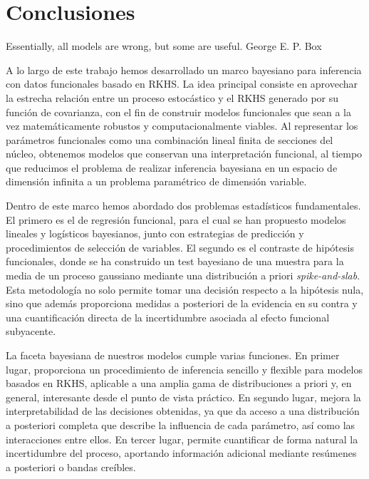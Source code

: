 \setcounter{saveddepth}{\value{tocdepth}}
\addtocounter{chapter}{-1}
\renewcommand{\theHchapter}{\thechapter.repeated} %
\chapter{Conclusiones}\label{ch:conclusiones}

\begin{flushquote}
    {Essentially, all models are wrong, but some are useful.}
    {George E. P. Box}
\end{flushquote}

A lo largo de este trabajo hemos desarrollado un marco bayesiano para inferencia con datos funcionales basado en \acs{RKHS}. La idea principal consiste en aprovechar la estrecha relación entre un proceso estocástico y el \acs{RKHS} generado por su función de covarianza, con el fin de construir modelos funcionales que sean a la vez matemáticamente robustos y computacionalmente viables. Al representar los parámetros funcionales como una combinación lineal finita de secciones del núcleo, obtenemos modelos que conservan una interpretación funcional, al tiempo que reducimos el problema de realizar inferencia bayesiana en un espacio de dimensión infinita a un problema paramétrico de dimensión variable.

Dentro de este marco hemos abordado dos problemas estadísticos fundamentales. El primero es el de regresión funcional, para el cual se han propuesto modelos lineales y logísticos bayesianos, junto con estrategias de predicción y procedimientos de selección de variables. El segundo es el contraste de hipótesis funcionales, donde se ha construido un test bayesiano de una muestra para la media de un proceso gaussiano mediante una distribución a priori \textit{spike-and-slab}. Esta metodología no solo permite tomar una decisión respecto a la hipótesis nula, sino que además proporciona medidas a posteriori de la evidencia en su contra y una cuantificación directa de la incertidumbre asociada al efecto funcional subyacente.

La faceta bayesiana de nuestros modelos cumple varias funciones. En primer lugar, proporciona un procedimiento de inferencia sencillo y flexible para modelos basados en \acs{RKHS}, aplicable a una amplia gama de distribuciones a priori y, en general, interesante desde el punto de vista práctico. En segundo lugar, mejora la interpretabilidad de las decisiones obtenidas, ya que da acceso a una distribución a posteriori completa que describe la influencia de cada parámetro, así como las interacciones entre ellos. En tercer lugar, permite cuantificar de forma natural la incertidumbre del proceso, aportando información adicional mediante resúmenes a posteriori o bandas creíbles.

